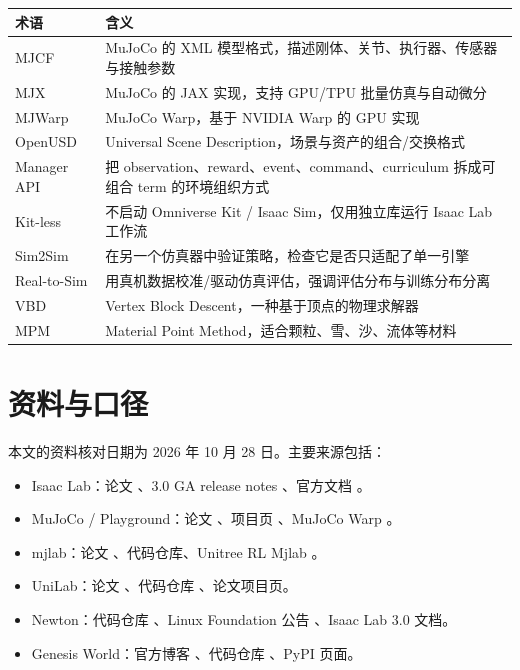 \documentclass[UTF8, 11pt, a4paper, fontset=windows]{ctexart}
\begin{document}
\begin{table}[htbp]
\centering
\small
\begin{tabularx}{\linewidth}{@{}L{2.4cm}Y@{}}
\toprule
\textbf{术语} & \textbf{含义} \\
\midrule
MJCF & MuJoCo 的 XML 模型格式，描述刚体、关节、执行器、传感器与接触参数 \\
MJX & MuJoCo 的 JAX 实现，支持 GPU/TPU 批量仿真与自动微分 \\
MJWarp & MuJoCo Warp，基于 NVIDIA Warp 的 GPU 实现 \\
OpenUSD & Universal Scene Description，场景与资产的组合/交换格式 \\
Manager API & 把 observation、reward、event、command、curriculum 拆成可组合 term 的环境组织方式 \\
Kit-less & 不启动 Omniverse Kit / Isaac Sim，仅用独立库运行 Isaac Lab 工作流 \\
Sim2Sim & 在另一个仿真器中验证策略，检查它是否只适配了单一引擎 \\
Real-to-Sim & 用真机数据校准/驱动仿真评估，强调评估分布与训练分布分离 \\
VBD & Vertex Block Descent，一种基于顶点的物理求解器 \\
MPM & Material Point Method，适合颗粒、雪、沙、流体等材料 \\
\bottomrule
\end{tabularx}
\end{table}

\section{资料与口径}

本文的资料核对日期为 2026 年 10 月 28 日。主要来源包括：

\begin{itemize}
  \item Isaac Lab：论文 \cite{isaaclab2025}、3.0 GA release notes \cite{isaaclabrelease2026}、官方文档 \cite{isaaclab3docs2026}。
  \item MuJoCo / Playground：论文 \cite{mujocoplayground2025}、项目页 \cite{playgroundsite2025}、MuJoCo Warp \cite{mujocowarp2026}。
  \item mjlab：论文 \cite{mjlab2026}、代码仓库、Unitree RL Mjlab \cite{unitreemjlab2026}。
  \item UniLab：论文 \cite{unilab2026}、代码仓库 \cite{unilabrepo2026}、论文项目页。
  \item Newton：代码仓库 \cite{newton2026}、Linux Foundation 公告 \cite{newtonlf2025}、Isaac Lab 3.0 文档。
  \item Genesis World：官方博客 \cite{genesisworld2026}、代码仓库 \cite{genesisrepo2026}、PyPI 页面。
\end{itemize}
\end{document}
